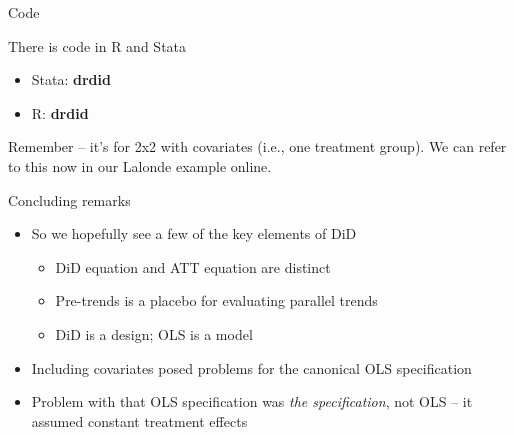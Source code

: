 \documentclass{beamer}
\begin{document}
\begin{frame}{Code}

There is code in R and Stata
\begin{itemize}
\item Stata: \textbf{drdid}
\item R: \textbf{drdid}
\end{itemize}
\bigskip
Remember -- it's for 2x2 with covariates (i.e., one treatment group). We can refer to this now in our Lalonde example online.

\end{frame}




\begin{frame}{Concluding remarks}

\begin{itemize}
\item So we hopefully see a few of the key elements of DiD
	\begin{itemize}
	\item DiD equation and ATT equation are distinct
	\item Pre-trends is a placebo for evaluating parallel trends
	\item DiD is a design; OLS is a model
	\end{itemize}
\item Including covariates posed problems for the canonical OLS specification
\item Problem with that OLS specification was \emph{the specification}, not OLS -- it assumed constant treatment effects
\end{itemize}

\end{frame}
\end{document}
